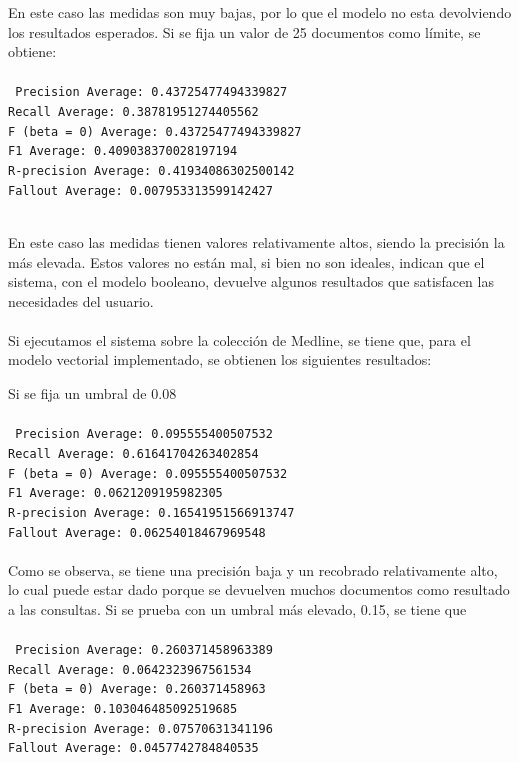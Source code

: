 \documentclass[twoside]{article}
\begin{document}
En este caso las medidas son muy bajas, por lo que el modelo no esta devolviendo los resultados esperados. Si se fija un valor de 25 documentos como l\'imite, se obtiene:\\\\
\texttt{
Precision Average: 0.43725477494339827 \\
Recall Average: 0.38781951274405562 \\
F (beta = 0) Average: 0.43725477494339827 \\
F1 Average: 0.409038370028197194 \\
R-precision Average: 0.41934086302500142 \\
Fallout Average: 0.007953313599142427 \\\\
}

En este caso las medidas tienen valores relativamente altos, siendo la precisi\'on la m\'as elevada. Estos valores no est\'an mal, si bien no son ideales, indican que el sistema, con el modelo booleano, devuelve algunos resultados que satisfacen las necesidades del usuario.\\\\

Si ejecutamos el sistema sobre la colecci\'on de Medline, se tiene que, para el modelo vectorial implementado, se obtienen los siguientes resultados:

Si se fija un umbral de 0.08\\\\
\texttt{
Precision Average: 0.095555400507532 \\
Recall Average: 0.61641704263402854 \\
F (beta = 0) Average: 0.095555400507532 \\
F1 Average: 0.0621209195982305 \\
R-precision Average: 0.16541951566913747 \\
Fallout Average: 0.06254018467969548 \\\\
}
Como se observa, se tiene una precisi\'on baja y un recobrado relativamente alto, lo cual puede estar dado porque se devuelven muchos documentos como resultado a las consultas. Si se prueba con un umbral m\'as elevado, 0.15, se tiene que\\\\
\texttt{
Precision Average: 0.260371458963389 \\
Recall Average: 0.0642323967561534 \\
F (beta = 0) Average: 0.260371458963 \\
F1 Average: 0.103046485092519685 \\
R-precision Average: 0.07570631341196 \\
Fallout Average: 0.0457742784840535 \\\\
}
\end{document}
